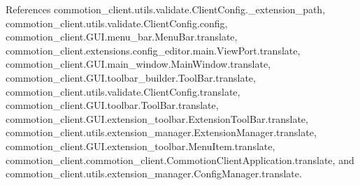References commotion\+\_\+client.\+utils.\+validate.\+Client\+Config.\+\_\+extension\+\_\+path, commotion\+\_\+client.\+utils.\+validate.\+Client\+Config.\+config, commotion\+\_\+client.\+G\+U\+I.\+menu\+\_\+bar.\+Menu\+Bar.\+translate, commotion\+\_\+client.\+extensions.\+config\+\_\+editor.\+main.\+View\+Port.\+translate, commotion\+\_\+client.\+G\+U\+I.\+main\+\_\+window.\+Main\+Window.\+translate, commotion\+\_\+client.\+G\+U\+I.\+toolbar\+\_\+builder.\+Tool\+Bar.\+translate, commotion\+\_\+client.\+utils.\+validate.\+Client\+Config.\+translate, commotion\+\_\+client.\+G\+U\+I.\+toolbar.\+Tool\+Bar.\+translate, commotion\+\_\+client.\+G\+U\+I.\+extension\+\_\+toolbar.\+Extension\+Tool\+Bar.\+translate, commotion\+\_\+client.\+utils.\+extension\+\_\+manager.\+Extension\+Manager.\+translate, commotion\+\_\+client.\+G\+U\+I.\+extension\+\_\+toolbar.\+Menu\+Item.\+translate, commotion\+\_\+client.\+commotion\+\_\+client.\+Commotion\+Client\+Application.\+translate, and commotion\+\_\+client.\+utils.\+extension\+\_\+manager.\+Config\+Manager.\+translate.


